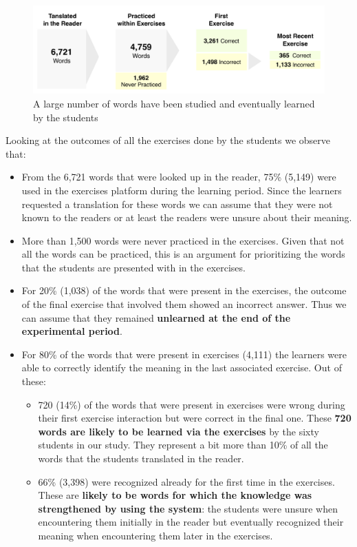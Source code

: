    \begin{figure}[h!]
  \centering
    \includegraphics[width=0.8\columnwidth]{figures/word-learning-flow.pdf}
    \caption{A large number of words have been studied and eventually learned by the students}
    \label{fig:word_learning_flow}
  \end{figure}

   Looking at the outcomes of all the exercises done by the students we observe that:

  \begin{itemize}
    \item From the 6,721 words that were looked up in the reader, 75\% (5,149) were used in the exercises platform during the learning period. Since the learners requested a translation for these words we can assume that they were not known to the readers or at least the readers were unsure about their meaning. 

    \item More than 1,500 words were never practiced in the exercises. Given that not all the words can be practiced, this is an argument for prioritizing the words that the students are presented with in the exercises.

    \item For 20\% (1,038) of the words that were present in the exercises, the outcome of the final exercise that involved them showed an incorrect answer. Thus we can assume that they remained {\bf unlearned at the end of the experimental period}.


    \item For 80\% of the words that were present in exercises (4,111) the learners were able to correctly identify the meaning in the last associated exercise. Out of these: 

    \begin{itemize}
      \item 720 (14\%) of the words that were present in exercises were wrong during their first exercise interaction but were correct in the final one. These {\bf 720 words are likely to be learned via the exercises} by the sixty students in our study. They represent a bit more than 10\% of all the words that the students translated in the reader.

      \item 66\% (3,398) were recognized already for the first time in the exercises. These are {\bf likely to be words for which the knowledge was strengthened by using the system}: the students were unsure when encountering them initially in the reader but eventually recognized their meaning when encountering them later in the exercises. 
    \end{itemize}


  \end{itemize}















